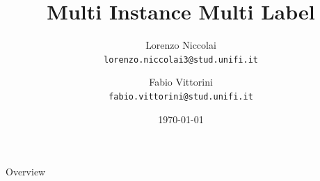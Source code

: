 \documentclass{beamer}
\title[MIML]{Multi Instance Multi Label}
\institute[]{{\large Machine Learning}\\\vspace{0.3cm}\textit{University of Florence, Department of Information Engineering}}
\author[L. Niccolai, F. Vittorini]
{\parbox[c]{1.5in}{Lorenzo Niccolai\\\texttt{\tiny lorenzo.niccolai3@stud.unifi.it}} \and 
\parbox[c]{1.5in}{Fabio Vittorini\\\texttt{\tiny fabio.vittorini@stud.unifi.it}}}
\date{\today}
\begin{document}
	
	
\frame[plain]{\titlepage} %

\usebackgroundtemplate
{
}



\begin{frame}{Overview}
	\tableofcontents
\end{frame}






	
\end{document}
